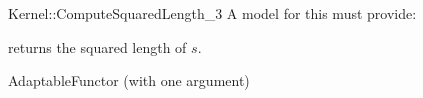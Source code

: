 \begin{ccRefFunctionObjectConcept}{Kernel::ComputeSquaredLength_3}
A model for this must provide:


       {returns the squared length of $s$. }

\ccRefines
AdaptableFunctor (with one argument)

\ccSeeAlso
{} \\

\end{ccRefFunctionObjectConcept}
